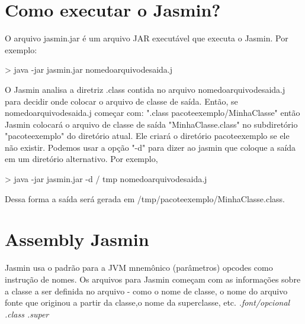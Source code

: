 \documentclass[12pt,a4paper,twoside]{report}
\begin{document}
\section{Como executar o Jasmin?}
O arquivo jasmin.jar é um arquivo JAR executável que executa o Jasmin. Por exemplo:
\begin{terminal}
>   java -jar jasmin.jar nomedoarquivodesaida.j 
\end{terminal}
O Jasmin analisa a diretriz .class contida no arquivo nomedoarquivodesaida.j  para decidir onde colocar o arquivo de classe de saída. Então, se nomedoarquivodesaida.j  começar com:     ".class pacoteexemplo/MinhaClasse"
então Jasmin colocará o arquivo de classe de saída "MinhaClasse.class" no subdiretório "pacoteexemplo" do diretório atual. Ele criará o diretório pacoteexemplo se ele não existir.
Podemos  usar a opção "-d" para dizer ao jasmin que coloque a saída em um diretório alternativo. Por exemplo,
\begin{terminal}
>   java -jar jasmin.jar -d / tmp nomedoarquivodesaida.j 
\end{terminal}
Dessa forma a saída será gerada em /tmp/pacoteexemplo/MinhaClasse.class.


\section{Assembly Jasmin}
Jasmin usa o padrão para a JVM mnemônico (parâmetros) opcodes como instrução de nomes.
Os arquivos para Jasmin começam com as informações sobre a classe a ser definida no arquivo
- como o nome de classe, o nome do arquivo fonte que originou a partir da classe,o nome da
superclasse, etc.
 \textit{.font/opcional .class .super}
\end{document}
